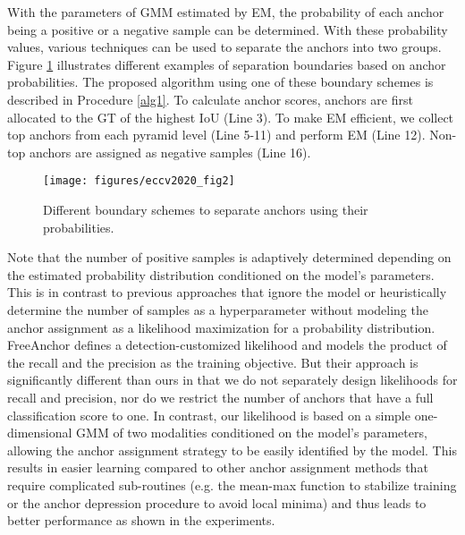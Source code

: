 \documentclass[runningheads]{llncs}
\begin{document}
With the parameters of GMM estimated by EM, the probability of each anchor being a positive or a negative sample can be determined. With these probability values, various techniques can be used to separate the anchors into two groups. Figure \ref{fig2} illustrates different examples of separation boundaries based on anchor probabilities. The proposed algorithm using one of these boundary schemes is described in Procedure \ref{alg1}.  To calculate anchor scores, anchors are first allocated to the GT of the highest IoU (Line 3). To make EM efficient, we collect top  anchors from each pyramid level (Line 5-11) and perform EM (Line 12). Non-top  anchors are assigned as negative samples (Line 16). 
\begin{figure}[t]
	\begin{center}
		\texttt{[image: figures/eccv2020\_fig2]}
	\end{center}
	\caption{Different boundary schemes to separate anchors using their probabilities.}
	\label{fig2}
\end{figure}

Note that the number of positive samples is adaptively determined depending on the estimated probability distribution conditioned on the model's parameters. This is in contrast to previous approaches that ignore the model\cite{atss} or heuristically determine the number of samples as a hyperparameter\cite{mal, noisy} without modeling the anchor assignment as a likelihood maximization for a probability distribution. FreeAnchor\cite{freeanchor} defines a detection-customized likelihood and models the product of the recall and the precision as the training objective. But their approach is significantly different than ours in that we do not separately design likelihoods for recall and precision, nor do we restrict the number of anchors that have a full classification score to one. In contrast, our likelihood is based on a simple one-dimensional GMM of two modalities conditioned on the model's parameters, allowing the anchor assignment strategy to be easily identified by the model. This results in easier learning compared to other anchor assignment methods that require complicated sub-routines (e.g. the mean-max function to stabilize training\cite{freeanchor} or the anchor depression procedure to avoid local minima\cite{mal}) and thus leads to better performance as shown in the experiments.
\end{document}
